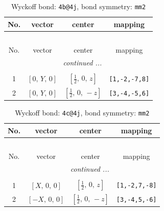 \documentclass[fleqn,8pt]{jsarticle}
\begin{document}
\renewcommand{\arraystretch}{1.2}
\begin{longtable}{cccc}
\caption{Wyckoff bond: {\tt 4b@4j}, bond symmetry: {\tt mm2}}
 \\
 \hline \hline
No. & vector & center & mapping \\ \hline \endfirsthead

\multicolumn{3}{l}{\tablename\ \thetable{}} \\
 \hline \hline
No. & vector & center & mapping \\ \hline \endhead

 \hline \hline
\multicolumn{3}{r}{\footnotesize\it continued ...} \\ \endfoot

 \hline \hline
\multicolumn{3}{r}{} \\ \endlastfoot

1 & $\left[ 0,\, Y,\, 0 \right]$ & $\left[ \frac{1}{2},\, 0,\, z \right]$ & {\tt [1,-2,-7,8]} \\ \hline
2 & $\left[ 0,\, Y,\, 0 \right]$ & $\left[ \frac{1}{2},\, 0,\, - z \right]$ & {\tt [3,-4,-5,6]} \\
\end{longtable}
\renewcommand{\arraystretch}{1.2}
\begin{longtable}{cccc}
\caption{Wyckoff bond: {\tt 4c@4j}, bond symmetry: {\tt mm2}}
 \\
 \hline \hline
No. & vector & center & mapping \\ \hline \endfirsthead

\multicolumn{3}{l}{\tablename\ \thetable{}} \\
 \hline \hline
No. & vector & center & mapping \\ \hline \endhead

 \hline \hline
\multicolumn{3}{r}{\footnotesize\it continued ...} \\ \endfoot

 \hline \hline
\multicolumn{3}{r}{} \\ \endlastfoot

1 & $\left[ X,\, 0,\, 0 \right]$ & $\left[ \frac{1}{2},\, 0,\, z \right]$ & {\tt [1,-2,7,-8]} \\ \hline
2 & $\left[ - X,\, 0,\, 0 \right]$ & $\left[ \frac{1}{2},\, 0,\, - z \right]$ & {\tt [3,-4,5,-6]} \\
\end{longtable}
\renewcommand{\arraystretch}{1.2}
\end{document}
